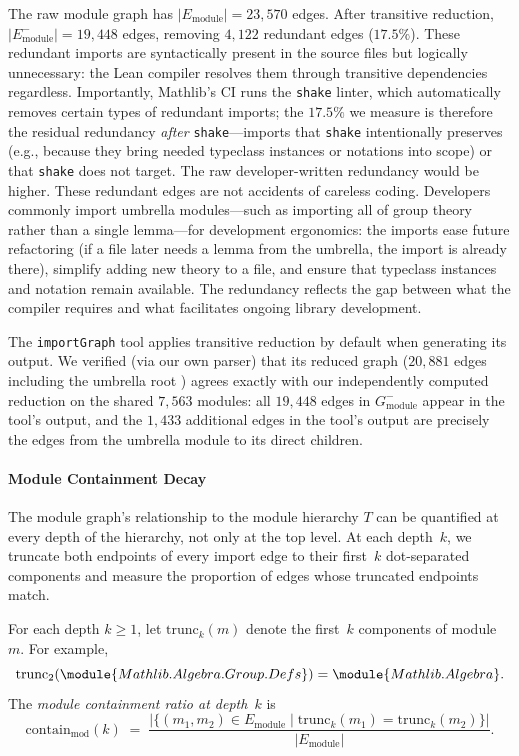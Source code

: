 The raw module graph has $|E_{\mathrm{module}}| = 23{,}570$ edges. After transitive reduction, $|E_{\mathrm{module}}^{-}| = 19{,}448$ edges, removing $4{,}122$ redundant edges ($17.5\%$). These redundant imports are syntactically present in the source files but logically unnecessary: the Lean compiler resolves them through transitive dependencies regardless. Importantly, Mathlib's CI runs the \texttt{shake} linter, which automatically removes certain types of redundant imports; the $17.5\%$ we measure is therefore the residual redundancy \emph{after} \texttt{shake}---imports that \texttt{shake} intentionally preserves (e.g., because they bring needed typeclass instances or notations into scope) or that \texttt{shake} does not target. The raw developer-written redundancy would be higher. These redundant edges are not accidents of careless coding. Developers commonly import umbrella modules---such as importing all of group theory rather than a single lemma---for development ergonomics: the imports ease future refactoring (if a file later needs a lemma from the umbrella, the import is already there), simplify adding new theory to a file, and ensure that typeclass instances and notation remain available. The redundancy reflects the gap between what the compiler requires and what facilitates ongoing library development.

The \texttt{importGraph} tool applies transitive reduction by default when generating its output. We verified (via our own parser) that its reduced graph ($20{,}881$ edges including the umbrella root ) agrees exactly with our independently computed reduction on the shared $7{,}563$ modules: all $19{,}448$ edges in $G_{\mathrm{module}}^{-}$ appear in the tool's output, and the $1{,}433$ additional edges in the tool's output are precisely the edges from the umbrella module  to its direct children.

\paragraph{Module Containment Decay}
\label{sec:module-containment}

The module graph's relationship to the module hierarchy $T$ can be quantified at every depth of the hierarchy, not only at the top level. At each depth~$k$, we truncate both endpoints of every import edge to their first~$k$ dot-separated components and measure the proportion of edges whose truncated endpoints match.

\begin{definition}
\label{def:module-containment}
For each depth $k \ge 1$, let $\mathrm{trunc}_k(m)$ denote the first~$k$ components of module~$m$. For example,
\[
  \mathrm{trunc}_2(\module{Mathlib.Algebra.Group.Defs}) = \module{Mathlib.Algebra}.
\]
The \emph{module containment ratio at depth~$k$} is
\[
  \mathrm{contain}_{\mathrm{mod}}(k) \;=\; \frac{|\{(m_1,m_2) \in E_{\mathrm{module}} \mid \mathrm{trunc}_k(m_1) = \mathrm{trunc}_k(m_2)\}|}{|E_{\mathrm{module}}|}.
\]
\end{definition}

